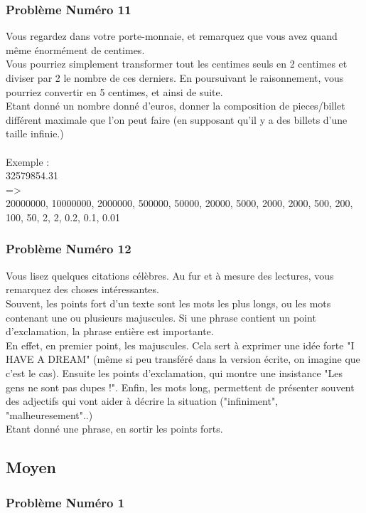 \documentclass[12pt]{article}
\begin{document}
\subsubsection{Problème Numéro 11}

Vous regardez dans votre porte-monnaie, et remarquez que vous avez quand même énormément de centimes.\\
Vous pourriez simplement transformer tout les centimes seuls en 2 centimes et diviser par 2 le nombre de ces derniers. En poursuivant le raisonnement, vous pourriez convertir en 5 centimes, et ainsi de suite.\\
Etant donné un nombre donné d'euros, donner la composition de pieces/billet différent maximale que l'on peut faire (en supposant qu'il y a des billets d'une taille infinie.)
\\\\
Exemple :\\
32579854.31\\
=\textgreater\\
20000000, 10000000, 2000000, 500000, 50000, 20000, 5000, 2000, 2000, 500, 200, 100, 50, 2, 2, 0.2, 0.1, 0.01

\subsubsection{Problème Numéro 12}

Vous lisez quelques citations célèbres. Au fur et à mesure des lectures, vous remarquez des choses intéressantes.\\
Souvent, les points fort d'un texte sont les mots les plus longs, ou les mots contenant une ou plusieurs majuscules. Si une phrase contient un point d'exclamation, la phrase entière est importante.\\
En effet, en premier point, les majuscules. Cela sert à exprimer une idée forte "I HAVE A DREAM" (même si peu transféré dans la version écrite, on imagine que c'est le cas). Ensuite les points d'exclamation, qui montre une insistance "Les gens ne sont pas dupes !". Enfin, les mots long, permettent de présenter souvent des adjectifs qui vont aider à décrire la situation ("infiniment", "malheuresement"..)\\
Etant donné une phrase, en sortir les points forts.

\subsection{Moyen}

\subsubsection{Problème Numéro 1}
\end{document}
